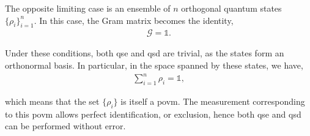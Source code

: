 \documentclass[12pt,letterpaper]{article}
\begin{document}
The opposite limiting case is an ensemble of $n$ orthogonal quantum states $\{\rho_i\}_{i=1}^{n}$. In this case, the Gram matrix becomes the identity,
\begin{align*}
	\mathcal{G} = \mathds{1}.
\end{align*}

Under these conditions, both \gls{qse} and \gls{qsd} are trivial, as the states form an orthonormal basis. In particular, in the space spanned by these states, we have,
\begin{align*}
	\sum_{i=1}^{n} \rho_i = \mathds{1},
\end{align*}

which means that the set $\{\rho_i\}$ is itself a \gls{povm}. The measurement corresponding to this \gls{povm} allows perfect identification, or exclusion, hence both \gls{qse} and \gls{qsd} can be performed without error.
\end{document}
